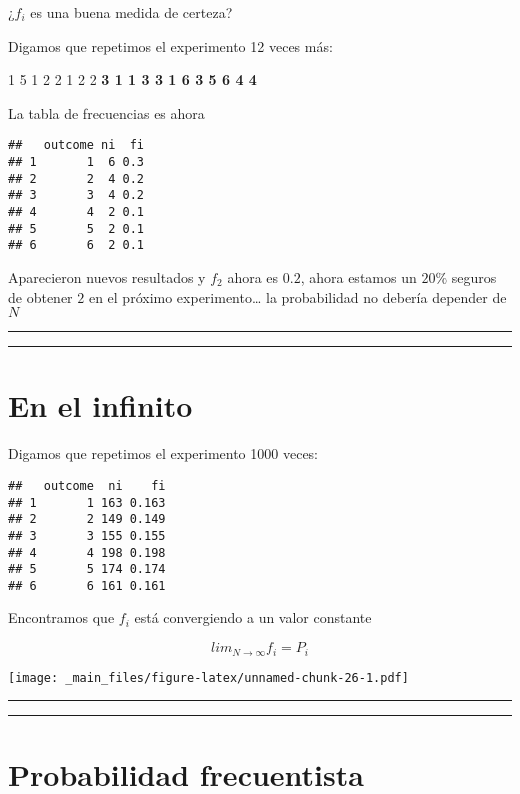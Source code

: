 \documentclass[
]{book}
\begin{document}
¿\(f_i\) es una buena medida de certeza?

Digamos que repetimos el experimento 12 veces más:

1 5 1 2 2 1 2 2 \textbf{3 1 1 3 3 1 6 3 5 6 4 4}

La tabla de frecuencias es ahora

\begin{verbatim}
##   outcome ni  fi
## 1       1  6 0.3
## 2       2  4 0.2
## 3       3  4 0.2
## 4       4  2 0.1
## 5       5  2 0.1
## 6       6  2 0.1
\end{verbatim}

Aparecieron nuevos resultados y \(f_2\) ahora es \(0.2\), ahora estamos un \(20\%\) seguros de obtener \(2\) en el próximo experimento\ldots{} la probabilidad no debería depender de \(N\)

\begin{center}\rule{0.5\linewidth}{0.5pt}\end{center}

\begin{center}\rule{0.5\linewidth}{0.5pt}\end{center}

\hypertarget{en-el-infinito}{%
\section{En el infinito}\label{en-el-infinito}}

Digamos que repetimos el experimento 1000 veces:

\begin{verbatim}
##   outcome  ni    fi
## 1       1 163 0.163
## 2       2 149 0.149
## 3       3 155 0.155
## 4       4 198 0.198
## 5       5 174 0.174
## 6       6 161 0.161
\end{verbatim}

Encontramos que \(f_i\) está convergiendo a un valor constante

\[lim_{N\rightarrow \infty} f_i = P_i\]

\texttt{[image: \_main\_files/figure-latex/unnamed-chunk-26-1.pdf]}

\begin{center}\rule{0.5\linewidth}{0.5pt}\end{center}

\begin{center}\rule{0.5\linewidth}{0.5pt}\end{center}

\hypertarget{probabilidad-frecuentista}{%
\section{Probabilidad frecuentista}\label{probabilidad-frecuentista}}
\end{document}
